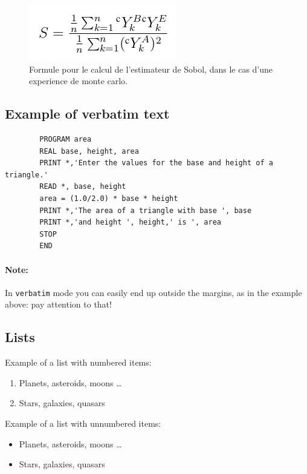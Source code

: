 \documentclass[a4paper,10pt]{article}
\begin{document}
\begin{figure}[H]
   \centering   
   \includegraphics[scale=0.45]{saltelliSensitivityFormula.png}
      \caption{Formule pour le calcul de l'estimateur de Sobol, dans le cas d'une experience de monte carlo. }
         \label{saltelliSensitivity}
\end{figure}

\subsection{Example of verbatim text}

\begin{verbatim}
        PROGRAM area
        REAL base, height, area
        PRINT *,'Enter the values for the base and height of a triangle.'
        READ *, base, height
        area = (1.0/2.0) * base * height
        PRINT *,'The area of a triangle with base ', base
        PRINT *,'and height ', height,' is ', area
        STOP
        END
\end{verbatim}

\paragraph{Note:}
In \texttt{verbatim} mode you can easily end up outside the
margins, as in the example above: pay attention to that!

\subsection{Lists}
Example of a list with numbered items:

   \begin{enumerate}
      \item  Planets, asteroids, moons \ldots
      \item  Stars, galaxies, quasars
  \end{enumerate}

Example of a list with unnumbered items:

   \begin{itemize}
      \item  Planets, asteroids, moons \ldots
      \item  Stars, galaxies, quasars
          
   \end{itemize}
\end{document}
